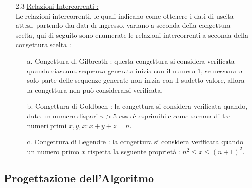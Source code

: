 \documentclass{article}
\begin{document}
\begin{enumerate}
\begin{enumerate}
     \end{enumerate}
    \Large\item[2.3] \underline{Relazioni Intercorrenti : }
    \large \\Le relazioni intercorrenti, le quali indicano come ottenere i dati di uscita attesi, partendo dai dati di ingresso, variano a seconda della congettura scelta, qui di seguito sono enumerate le relazioni intercorrenti a seconda della congettura scelta : 
    \begin{enumerate}
        \item[a.] Congettura di Gilbreath : questa congettura si considera verificata quando ciascuna sequenza generata inizia con il numero \begin{math}1\end{math}, se nessuna o solo parte delle sequenze generate non inizia con il sudetto valore, allora la congettura non può considerarsi verificata.
       \item[b.] Congettura di Goldbach : la congettura si considera verificata quando, dato un numero dispari \begin{math}n > 5\end{math} esso è esprimibile come somma di tre numeri primi \begin{math} x, y, x : x + y + z = n\end{math}.
        \item[c.] Congettura di Legendre : la congettura si considera verificata quando un numero primo \begin{math} x \end{math} rispetta la seguente proprietà :  \begin{math}n^2 \leq x \leq (n + 1)^2\end{math}.
    \end{enumerate}
\end{enumerate}
\newpage
\begin{center}
    \section{Progettazione dell'Algoritmo}
\end{center}
\end{document}
